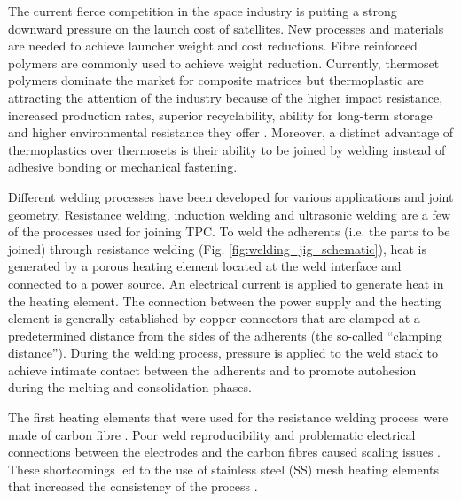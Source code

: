 \documentclass[11pt,review,times]{elsarticle}
\begin{document}
The current fierce competition in the space industry is putting a strong downward pressure on the launch cost of satellites. 
New processes and materials are needed to achieve launcher weight and cost reductions. 
Fibre reinforced polymers are commonly used to achieve weight reduction. 
Currently, thermoset polymers dominate the market for composite matrices but thermoplastic are attracting the attention of the industry \cite{CompositeWorldSloan2018} because of the higher impact resistance, increased production rates, superior recyclability, ability for long-term storage and higher environmental resistance they offer \cite{cogswell1992}. 
Moreover, a distinct advantage of thermoplastics over thermosets is their ability to be joined by welding instead of adhesive bonding or mechanical fastening. 

Different welding processes have been developed for various applications and joint geometry. 
Resistance welding, induction welding and ultrasonic welding are a few of the processes used for joining TPC. 
To weld the adherents (i.e. the parts to be joined) through resistance welding (Fig. \ref{fig:welding_jig_schematic}), heat is generated by a porous heating element located at the weld interface and connected to a power source. 
An electrical current is applied to generate heat in the heating element. 
The connection between the power supply and the heating element is generally established by copper connectors that are clamped at a predetermined distance from the sides of the adherents (the so-called “clamping distance”). 
During the welding process, pressure is applied to the weld stack to achieve intimate contact between the adherents and to promote autohesion during the melting and consolidation phases. 

The first heating elements that were used for the resistance welding process were made of carbon fibre  \cite{Ageorges2000a,houghton1984bonding,Eveno1988}.
Poor weld reproducibility and problematic electrical connections between the electrodes and the carbon fibres caused scaling issues \cite{McKnight1997}. 
These shortcomings led to the use of stainless steel (SS) mesh heating elements that increased the consistency of the process \cite{Hou1999a}.
\end{document}
